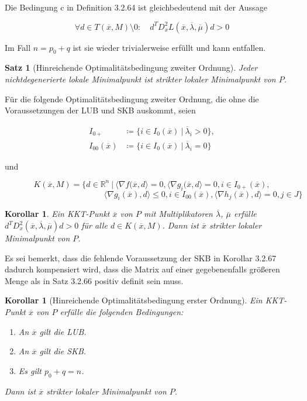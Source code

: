 \documentclass[11pt]{scrreprt}
\newcounter{thm}
\theoremstyle{thmstyle}
\numberwithin{thm}{section}
\newtheorem{korollar}[thm]{Korollar}
\newtheorem{satz}[thm]{Satz}
\begin{document}
Die Bedingung c in Definition 3.2.64 ist gleichbedeutend mit der Aussage


$$ \forall d \in T(\overline{x},M) \setminus 0: \quad d^T D^2_x L(\overline{x}, \overline{\lambda}, \overline{\mu}) d > 0 $$

Im Fall $n = p_0 + q$ ist sie wieder trivialerweise erfüllt und kann entfallen.

\begin{satz}[Hinreichende Optimalitätsbedingung zweiter Ordnung]
	Jeder nichtdegenerierte lokale Minimalpunkt ist strikter lokaler Minimalpunkt von $P$.
\end{satz}

Für die folgende Optimalitätsbedingung zweiter Ordnung, die ohne die Voraussetzungen der LUB und SKB auskommt, seien

\begin{align*}
	I_{0+} & \coloneqq \big\{ i \in I_0(\overline{x}) ~|~ \overline{\lambda}_i > 0 \big\}, \\
	I_{00} (\overline{x}) & \coloneqq \big\{ i \in I_{0}(\overline{x}) ~|~ \overline{\lambda}_i = 0 \big\}
\end{align*}

und


	$$ K(\overline{x}, M) = \big\{ d \in \mathbb{R}^n ~|~\langle \nabla f(\overline{x}, d \rangle = 0, \langle \nabla g_i(\overline{x}, d \rangle =0, i \in I_{0+}(\overline{x}), $$
	$$ ~ \hspace{5cm} \langle \nabla g_i(\overline{x}) , d \rangle \leq 0, i \in I_{00}(\overline{x}), \langle \nabla h_j(\overline{x}), d \rangle = 0, j \in J \big\} $$

\begin{korollar}
	Ein KKT-Punkt $\overline{x}$ von $P$ mit Multiplikatoren $\overline{\lambda}$, $\overline{\mu}$ erfülle $d^T D_x^2(\overline{x}, \overline{\lambda}, \overline{\mu}) d  > 0$ für alle $d \in K(\overline{x}, M)$. Dann ist $\overline{x}$ strikter lokaler Minimalpunkt von $P$.
\end{korollar}

Es sei bemerkt, dass die fehlende Voraussetzung der SKB in Korollar 3.2.67 dadurch kompensiert wird, dass die Matrix auf einer gegebenenfalls größeren Menge als in Satz 3.2.66 positiv definit sein muss.

\begin{korollar}[Hinreichende Optimalitätsbedingung erster Ordnung]
	Ein KKT-Punkt $\overline{x}$ von $P$ erfülle die folgenden Bedingungen:
	\begin{enumerate}[label=\alph*\upshape)]
		\item An $\overline{x}$ gilt die LUB.
		\item An $\overline{x}$ gilt die SKB.
		\item Es gilt $p_0 + q = n$.
	\end{enumerate}
Dann ist $\overline{x}$ strikter lokaler Minimalpunkt von $P$.
\end{korollar}
\end{document}
